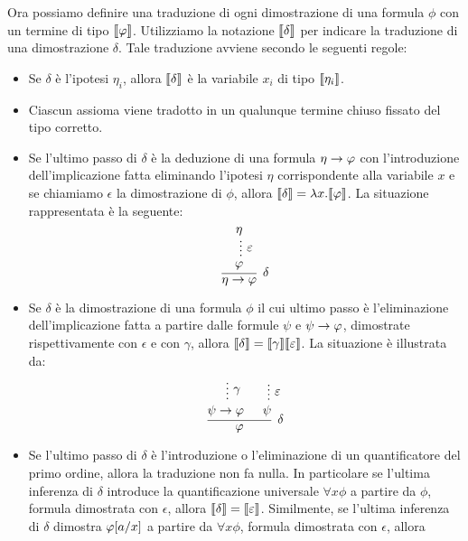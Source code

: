 \documentclass[]{marticle}
\begin{document}
Ora possiamo definire una traduzione di ogni dimostrazione di una formula $\phi$
con un termine di tipo $\llbracket \varphi \rrbracket$. Utilizziamo la notazione $\llbracket \delta \rrbracket$ per
indicare la traduzione di una dimostrazione $\delta$. Tale traduzione avviene
secondo le seguenti regole:
\begin{itemize}
    \item Se $\delta$ \`e l'ipotesi $\eta_i$, allora $\llbracket \delta \rrbracket$ \`e la
        variabile $x_i$ di tipo $\llbracket \eta_i \rrbracket$.
    \item Ciascun assioma viene tradotto in un qualunque termine chiuso fissato
        del tipo corretto.
    \item Se l'ultimo passo di $\delta$ \`e la deduzione di una formula
        $\eta\rightarrow\varphi$ con l'introduzione dell'implicazione fatta eliminando
        l'ipotesi $\eta$ corrispondente alla variabile $x$ e se chiamiamo
        $\epsilon$ la dimostrazione di $\phi$, allora $\llbracket \delta \rrbracket = \lambda x.
        \llbracket \varphi \rrbracket$. La situazione rappresentata \`e la seguente:
        \[
            \begin{prooftree}
                \hypo{\eta}
                \ellipsis{$\epsilon$}{\phi}
                \infer1[$\delta$]{\eta\rar\phi} 
            \end{prooftree}
        \]
    \item Se $\delta$ \`e la dimostrazione di una formula $\phi$ il cui ultimo
        passo \`e l'eliminazione dell'implicazione fatta a partire dalle formule
        $\psi$ e $\psi\rightarrow\varphi$, dimostrate rispettivamente con $\epsilon$ e con
        $\gamma$, allora $\llbracket \delta \rrbracket = \llbracket \gamma \rrbracket\llbracket \varepsilon \rrbracket$.
        La situazione \`e illustrata da:
        \[
            \begin{prooftree}
                \hypo{}
                \ellipsis{$\gamma$}{\psi\rar\phi}
                \hypo{}
                \ellipsis{$\epsilon$}{\psi}
                \infer2[$\delta$]{\phi}
            \end{prooftree}
        \]
    \item Se l'ultimo passo di $\delta$ \`e l'introduzione o l'eliminazione di
        un quantificatore del primo ordine, allora la traduzione non fa nulla.
        In particolare se l'ultima inferenza di $\delta$ introduce la
        quantificazione universale $\forall x\phi$ a partire da $\phi$, formula
        dimostrata con $\epsilon$, allora $\llbracket \delta \rrbracket=\llbracket \varepsilon \rrbracket$.
        Similmente, se l'ultima inferenza di $\delta$ dimostra $\varphi [a/x]$
        a partire da $\forall x \phi$, formula dimostrata con $\epsilon$, allora

\end{itemize}
\end{document}
